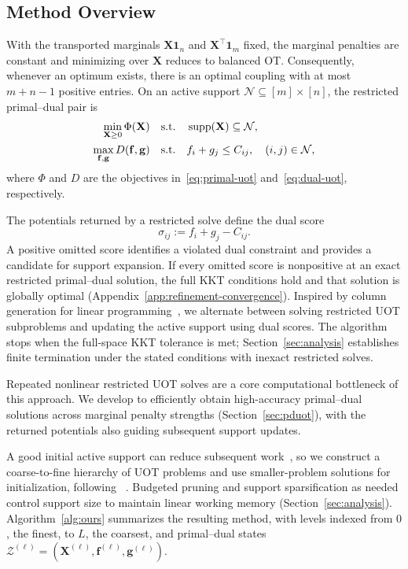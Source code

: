 \subsection{Method Overview}
\label{sec:framework}

With the transported marginals $\mathbf{X}\mathbf{1}_n$ and $\mathbf{X}^\top\mathbf{1}_m$ fixed, the marginal penalties are constant and minimizing over $\mathbf{X}$ reduces to balanced OT.
Consequently, whenever an optimum exists, there is an optimal coupling with at most $m+n-1$ positive entries.
On an active support $\mathcal N\subseteq[m]\times[n]$, the restricted primal--dual pair is
\begin{equation}
\label{eq:restricted-uot}
\begin{aligned}
\min_{\mathbf X\geq0}\Phi(\mathbf X)\quad&\text{s.t.}\quad \operatorname{supp}(\mathbf X)\subseteq\mathcal N,\\
\max_{\mathbf f,\mathbf g}D(\mathbf f,\mathbf g)
\quad&\text{s.t.}\quad f_i+g_j\leq C_{ij},\quad(i,j)\in\mathcal N,
\end{aligned}
\end{equation}
where $\Phi$ and $D$ are the objectives in~\eqref{eq:primal-uot} and~\eqref{eq:dual-uot}, respectively.

The potentials returned by a restricted solve define the dual score
\begin{equation}
\label{eq:dual-score}
\sigma_{ij}:=f_i+g_j-C_{ij}.
\end{equation}
A positive omitted score identifies a violated dual constraint and provides a candidate for support expansion.
If every omitted score is nonpositive at an exact restricted primal--dual solution, the full KKT conditions hold and that solution is globally optimal (Appendix~\ref{app:refinement-convergence}).
Inspired by column generation for linear programming~\citep{lubbecke2005selected}, we alternate between solving restricted UOT subproblems and updating the active support using dual scores.
The algorithm stops when the full-space KKT tolerance is met; Section~\ref{sec:analysis} establishes finite termination under the stated conditions with inexact restricted solves.

Repeated nonlinear restricted UOT solves are a core computational bottleneck of this approach.
We develop \subsolver to efficiently obtain high-accuracy primal--dual solutions across marginal penalty strengths (Section~\ref{sec:pduot}), with the returned potentials also guiding subsequent support updates.

A good initial active support can reduce subsequent work~\citep{schmitzer2016sparse,xia2026memory}, so we construct a coarse-to-fine hierarchy of UOT problems and use smaller-problem solutions for initialization, following \hello~\citep{xia2026dual}.
Budgeted pruning and support sparsification as needed control support size to maintain linear working memory (Section~\ref{sec:analysis}).
Algorithm~\ref{alg:ours} summarizes the resulting method, with levels indexed from $0$, the finest, to $L$, the coarsest, and primal--dual states $\mathcal Z^{(\ell)}=(\mathbf X^{(\ell)},\mathbf f^{(\ell)},\mathbf g^{(\ell)})$.


